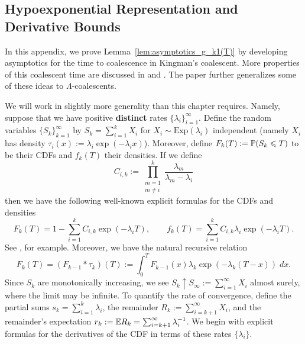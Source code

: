 \begin{subappendices}
\subsection{Hypoexponential Representation and Derivative Bounds}
\label{app:hypoexponential-derivative-bounds}


In this appendix, we prove Lemma~\ref{lem:asymptotics_g_k1(T)} by developing
asymptotics for the time to coalescence in Kingman's coalescent. More properties of this
coalescent time are discussed in \cite{moehle2015_absorption_time_tree_length} and
\cite{chen2013_asymptotic_coefficients_lagrange}. The paper
\cite{kersting2017_absorption_time_lambda_coalescents} further generalizes some of these
ideas to $\Lambda$-coalescents.

 We will work in slightly more generality than this chapter requires. Namely, suppose that we have positive \textbf{distinct} rates $\{\lambda_i\}_{i=1}^\infty$. Define the random variables $\{S_k\}_{k =1}^\infty$ by $S_k = \sum_{i=1}^k X_i$ for $X_i \sim \mathrm{Exp}(\lambda_i)$ independent (namely $X_i$ has density $\tau_i(x) := \lambda_i \exp(-\lambda_i x)$). Moreover, define $F_k(T) := \P(S_k \leq T)$ to be their CDFs and $f_k(T)$ their densities. If we define
%
\[C_{i,k} := \prod_{\substack{m=1 \\ m \neq i}}^k \frac{\lambda_m}{\lambda_m - \lambda_i}\]
%
\noindent then we have the following well-known explicit formulas for the CDFs and densities
%
\begin{equation}
    F_k(T) = 1-\sum_{i=1}^k C_{i,k} \exp(-\lambda_i T), \qquad f_k(T) = \sum_{i=1}^k C_{i,k} \lambda_i \exp(-\lambda_i T).
    \label{eqn:cdf_density_hypoexponential}
\end{equation}
%
\noindent See \cite{yanev2020_exponential_hypoexponential_characterizations}, for example. Moreover, we have the natural recursive relation
%
\begin{equation}
    F_k(T) = (F_{k-1} \ast \tau_k)(T) := \int_0^T F_{k-1}(x) \lambda_k \exp(-\lambda_k (T-x)) \; dx.
    \label{eqn:recursion_convolution}
\end{equation}
%
Since $S_k$ are monotonically increasing, we see $S_k \uparrow S_\infty := \sum_{i=1}^\infty X_i$ almost surely, where the limit may be infinite. To quantify the rate of convergence, define the partial sums $s_k  = \sum_{i=1}^k \lambda_i$, the remainder $R_k := \sum_{i=k+1}^\infty X_i$, and the remainder's expectation $r_k := \E R_k= \sum_{i=k+1}^\infty \lambda_i^{-1}$. We begin with explicit formulas for the derivatives of the CDF in terms of these rates $\{\lambda_i\}$.


\end{subappendices}
